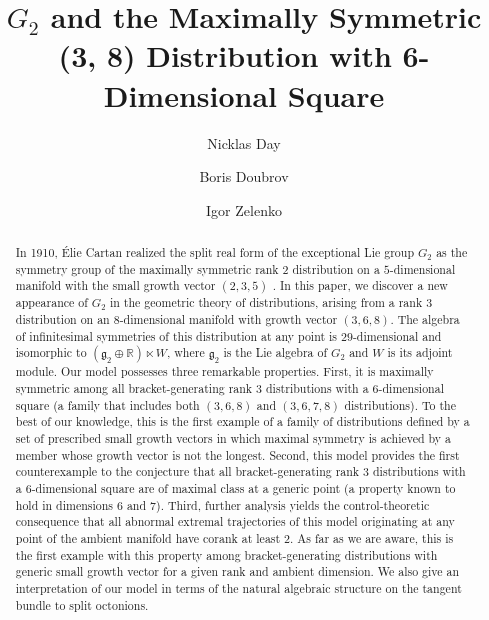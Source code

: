 \documentclass[11pt,letterpaper]{amsart}
\title[$G_2$ and the Maximally Symmetric $(3, 6,\ldots , 8)$ Distribution]{$G_2$ and the Maximally Symmetric (3, 8) Distribution with 6-Dimensional Square}
\author{Nicklas Day}
\author{Boris Doubrov}
\author{Igor Zelenko}
\numberwithin{equation}{section}
\begin{document}


\begin{abstract}
In 1910, \'{E}lie Cartan realized the split real form of the exceptional Lie group $G_2$ as the symmetry group of the maximally symmetric rank 2 distribution on a $5$-dimensional manifold with the small growth vector $(2,3,5)$ \cite{FiveVariables}. In this paper, we discover a new appearance of $G_2$ in the geometric theory of distributions, arising from a rank 3 distribution on an $8$-dimensional manifold with growth vector $(3,6,8)$. The algebra of infinitesimal symmetries of this distribution at any point is $29$-dimensional and isomorphic to $(\mathfrak{g}_2 \oplus \mathbb{R}) \ltimes W$, where $\mathfrak{g}_2$ is the Lie algebra of $G_2$ and $W$ is its adjoint module. Our model possesses three remarkable properties. First, it is maximally symmetric among all bracket-generating rank 3 distributions with a $6$-dimensional square (a family that includes both $(3,6,8)$ and $(3,6,7,8)$ distributions). To the best of our knowledge, this is the first example of a family of distributions defined by a set of prescribed small growth vectors in which maximal symmetry is achieved by a member whose growth vector is not the longest.
Second, this model provides the first counterexample to the conjecture that all bracket-generating rank 3 distributions with a $6$-dimensional square are of maximal class at a generic point (a property known to hold in dimensions $6$ and $7$). Third, further analysis yields the control-theoretic consequence that all abnormal extremal trajectories of this model originating at any point of the ambient manifold have corank at least $2$. As far as we are aware, this is the first example with this property among bracket-generating distributions with generic small growth vector for a given rank and ambient dimension. We also give an interpretation of our model in terms of the natural algebraic structure on the tangent bundle to split octonions.
\end{abstract}
\maketitle 
\end{document}
